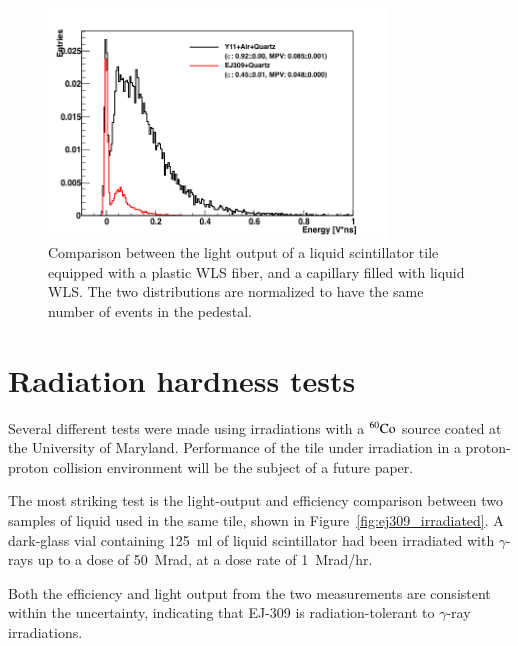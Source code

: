 \documentclass[review]{elsarticle}
\begin{document}
\begin{figure}[!ht]
\begin{center}
\includegraphics[width=0.8\textwidth]{./figures/list_RO_FIBER_all_norm.png}
\caption{Comparison between the light output of a liquid scintillator
  tile equipped with a plastic WLS fiber, and a capillary filled with
  liquid WLS. The two distributions are normalized to have the same
  number of events in the pedestal.}
\label{fig:y11_vs_cap}
\end{center}
\end{figure}


\section{Radiation hardness tests}

Several different tests were made using irradiations with a
$\rm{^{60}Co}$ source coated at the University of Maryland.
Performance of the tile under irradiation in a proton-proton collision
environment will be the subject of a future paper.

The most striking test is the light-output and efficiency comparison
between two samples of liquid used in the same tile, shown in
Figure~\ref{fig:ej309_irradiated}. A dark-glass vial containing 125~ml
of liquid scintillator had been irradiated with $\gamma$-rays up to a
dose of 50~Mrad, at a dose rate of 1~Mrad/hr.

Both the efficiency and light output from the two measurements are
consistent within the uncertainty, indicating that EJ-309 is
radiation-tolerant to $\gamma$-ray irradiations.
\end{document}
